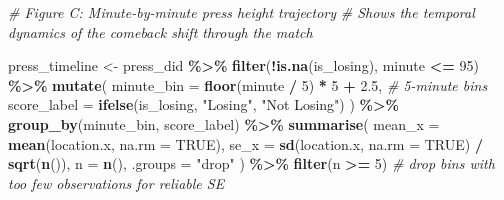 \documentclass[
]{article}
\newenvironment{Shaded}{\begin{snugshade}}{\end{snugshade}}
\newcommand{\AttributeTok}[1]{\textcolor[rgb]{0.13,0.29,0.53}{#1}}
\newcommand{\CommentTok}[1]{\textcolor[rgb]{0.56,0.35,0.01}{\textit{#1}}}
\newcommand{\ConstantTok}[1]{\textcolor[rgb]{0.56,0.35,0.01}{#1}}
\newcommand{\DecValTok}[1]{\textcolor[rgb]{0.00,0.00,0.81}{#1}}
\newcommand{\FloatTok}[1]{\textcolor[rgb]{0.00,0.00,0.81}{#1}}
\newcommand{\FunctionTok}[1]{\textcolor[rgb]{0.13,0.29,0.53}{\textbf{#1}}}
\newcommand{\NormalTok}[1]{#1}
\newcommand{\OtherTok}[1]{\textcolor[rgb]{0.56,0.35,0.01}{#1}}
\newcommand{\SpecialCharTok}[1]{\textcolor[rgb]{0.81,0.36,0.00}{\textbf{#1}}}
\newcommand{\StringTok}[1]{\textcolor[rgb]{0.31,0.60,0.02}{#1}}
\begin{document}
\begin{Shaded}
\begin{Highlighting}[]
\CommentTok{\# Figure C: Minute{-}by{-}minute press height trajectory}
\CommentTok{\# Shows the temporal dynamics of the comeback shift through the match}

\NormalTok{press\_timeline }\OtherTok{\textless{}{-}}\NormalTok{ press\_did }\SpecialCharTok{\%\textgreater{}\%}
  \FunctionTok{filter}\NormalTok{(}\SpecialCharTok{!}\FunctionTok{is.na}\NormalTok{(is\_losing), minute }\SpecialCharTok{\textless{}=} \DecValTok{95}\NormalTok{) }\SpecialCharTok{\%\textgreater{}\%}
  \FunctionTok{mutate}\NormalTok{(}
    \AttributeTok{minute\_bin  =} \FunctionTok{floor}\NormalTok{(minute }\SpecialCharTok{/} \DecValTok{5}\NormalTok{) }\SpecialCharTok{*} \DecValTok{5} \SpecialCharTok{+} \FloatTok{2.5}\NormalTok{,  }\CommentTok{\# 5{-}minute bins}
    \AttributeTok{score\_label =} \FunctionTok{ifelse}\NormalTok{(is\_losing, }\StringTok{"Losing"}\NormalTok{, }\StringTok{"Not Losing"}\NormalTok{)}
\NormalTok{  ) }\SpecialCharTok{\%\textgreater{}\%}
  \FunctionTok{group\_by}\NormalTok{(minute\_bin, score\_label) }\SpecialCharTok{\%\textgreater{}\%}
  \FunctionTok{summarise}\NormalTok{(}
    \AttributeTok{mean\_x =} \FunctionTok{mean}\NormalTok{(location.x, }\AttributeTok{na.rm =} \ConstantTok{TRUE}\NormalTok{),}
    \AttributeTok{se\_x   =} \FunctionTok{sd}\NormalTok{(location.x,   }\AttributeTok{na.rm =} \ConstantTok{TRUE}\NormalTok{) }\SpecialCharTok{/} \FunctionTok{sqrt}\NormalTok{(}\FunctionTok{n}\NormalTok{()),}
    \AttributeTok{n      =} \FunctionTok{n}\NormalTok{(),}
    \AttributeTok{.groups =} \StringTok{"drop"}
\NormalTok{  ) }\SpecialCharTok{\%\textgreater{}\%}
  \FunctionTok{filter}\NormalTok{(n }\SpecialCharTok{\textgreater{}=} \DecValTok{5}\NormalTok{)   }\CommentTok{\# drop bins with too few observations for reliable SE}


\end{Highlighting}
\end{Shaded}
\end{document}
